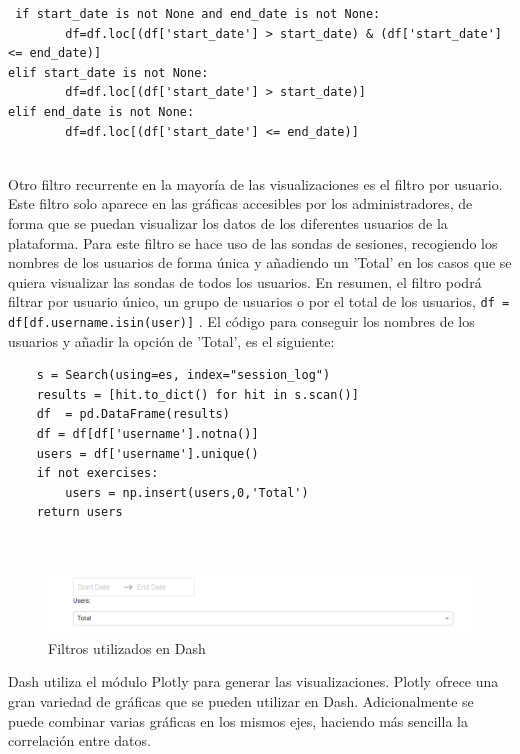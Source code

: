 {\footnotesize
\begin{verbatim}
 if start_date is not None and end_date is not None:
        df=df.loc[(df['start_date'] > start_date) & (df['start_date'] <= end_date)]
elif start_date is not None:
        df=df.loc[(df['start_date'] > start_date)]
elif end_date is not None:
        df=df.loc[(df['start_date'] <= end_date)]
\end{verbatim}
}
\\

Otro filtro recurrente en la mayoría de las visualizaciones es el filtro por usuario. Este filtro solo aparece en las gráficas accesibles por los administradores, de forma que se puedan visualizar los datos de los diferentes usuarios de la plataforma. Para este filtro se hace uso de las sondas de sesiones, recogiendo los nombres de los usuarios de forma única y añadiendo un 'Total' en los casos que se quiera visualizar las sondas de todos los usuarios. En resumen, el filtro podrá filtrar por usuario único, un grupo de usuarios o por el total de los usuarios, \newline\texttt{df = df[df.username.isin(user)]} . El código para conseguir los nombres de los usuarios y añadir la opción de 'Total', es el siguiente:

{\footnotesize
\begin{verbatim}
	s = Search(using=es, index="session_log")
    results = [hit.to_dict() for hit in s.scan()]
    df  = pd.DataFrame(results)
    df = df[df['username'].notna()]
    users = df['username'].unique()
    if not exercises:
        users = np.insert(users,0,'Total')
    return users
\end{verbatim}
}
\\
\begin{figure}[H]
    \centering
    \includegraphics[width=16cm, keepaspectratio]{img/filtros.png}
    \caption{Filtros utilizados en Dash}
    \label{fig:filtros}
\end{figure}

Dash utiliza el módulo Plotly para generar las visualizaciones. Plotly ofrece una gran variedad de gráficas que se pueden utilizar en Dash. Adicionalmente se puede combinar varias gráficas en los mismos ejes, haciendo más sencilla la correlación entre datos.\\

